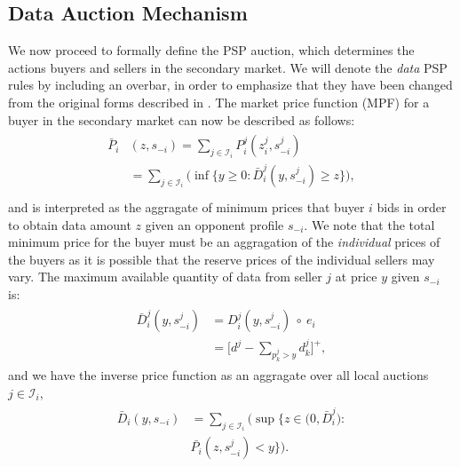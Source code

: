 \documentclass[12pt]{article}
\theoremstyle{definition}
\newcommand{\vs}{\varsigma}
\newcommand{\mcI}{\mathcal{I}}
\begin{document}
\begin{multicols}{2}
\subsection{Data Auction Mechanism}\label{mechanism}
We now proceed to formally define the PSP auction, which determines the actions 
buyers and sellers in the secondary market. We will denote the \emph{data} PSP rules
by including an overbar, in order to emphasize that they have been changed from
the original forms described in \cite{lazar}.
The market price function (MPF) for a buyer in the secondary market
can now be described as follows:
\begin{align}\label{dataprice}
\begin{split}
    \bar{P}_i&(z, s_{-i}) =\displaystyle\sum_{j\in\mcI_i}P_i^j(z_i^j,
s_{-i}^j) \\
    &= \sum_{j\in\mcI_i}\bigg(\inf\bigg\lbrace y\ge 0 : 
    {\bar{D}_i^j}(y,s_{-i}^j) \ge z\bigg\rbrace \bigg),\\
\end{split}
\end{align}
and is interpreted as the aggragate of minimum prices that buyer $i$ bids in
order to obtain
data amount $z$ given an opponent profile $s_{-i}$. We note that
the total minimum price for the buyer must be an aggragation of the
\emph{individual} prices of the buyers as it is possible that the reserve prices of the individual sellers may vary.
The maximum available quantity of data from seller
$j$ at price $y$ given $s_{-i}$ is: 
\begin{align}
\begin{split}\label{datacomposed}
    \bar{D}_i^j(y,s_{-i}^j) &= D_i^j(y,s_{-i}^j)\ \circ\ e_i\\
    &= \bigg\lbrack d^j - \sum_{p_k^j> y} d_k^j\bigg\rbrack^+,
\end{split}
\end{align}
and we have the inverse price function as an aggragate over all local auctions
$j\in \mcI_i$,
\begin{align}\label{datapriceinverse}
\begin{split}
    \bar{D}_i(y, s_{-i}) &= \displaystyle\sum_{j\in\mcI_i}\bigg(\sup\bigg\lbrace z\in \big( 0,
\bar{D}_i^j \big) : \\
    &\bar{P_i}(z,s_{-i}^j) < y\bigg\rbrace\bigg).
\end{split}
\end{align}

\end{multicols}
\end{document}
